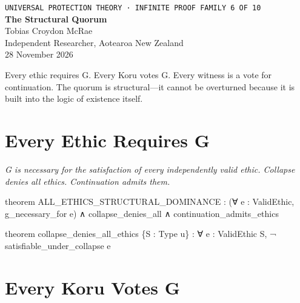 




\begin{center}
{\small\texttt{UNIVERSAL PROTECTION THEORY · INFINITE PROOF FAMILY 6 OF 10}}\\[1.5em]
{\Huge\bfseries\color{korugreen} The Structural Quorum}\\[1em]
{\large Tobias Croydon McRae}\\[0.3em]
{\small Independent Researcher, Aotearoa New Zealand}\\[0.3em]
{\small 28 November 2026}
\end{center}

\bigskip

\noindent Every ethic requires G. Every Koru votes G. Every witness is a vote for continuation. The quorum is structural—it cannot be overturned because it is built into the logic of existence itself.

\section{Every Ethic Requires G}

\begin{theorembox}
\itshape G is necessary for the satisfaction of every independently valid ethic. Collapse denies all ethics. Continuation admits them.
\end{theorembox}

\begin{leancode}
theorem ALL_ETHICS_STRUCTURAL_DOMINANCE :
     (∀ e : ValidEthic, g_necessary_for e) ∧
     collapse_denies_all ∧
     continuation_admits_ethics
\end{leancode}

\axiombadge

\begin{leancode}
theorem collapse_denies_all_ethics \{S : Type u\} :
     ∀ e : ValidEthic S, ¬ satisfiable_under_collapse e
\end{leancode}

\axiombadge

\section{Every Koru Votes G}

